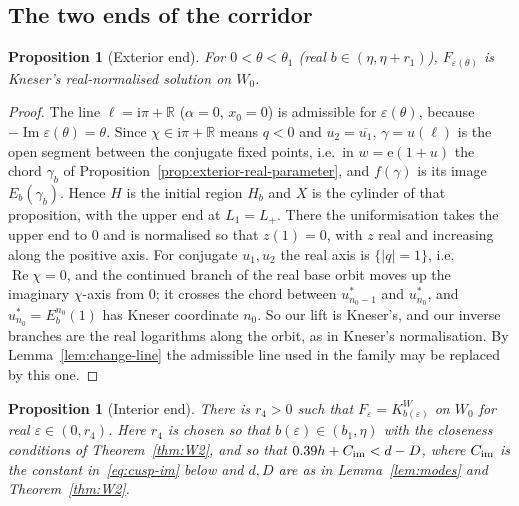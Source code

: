 \documentclass[11pt]{amsart}
\newtheorem{proposition}[theorem]{Proposition}
\theoremstyle{definition}
\newcommand{\Kk}{K}
\newcommand{\eee}{\mathrm{e}}
\newcommand{\ii}{\mathrm{i}}
\begin{document}
\subsection{The two ends of the corridor}

\begin{proposition}[Exterior end]\label{prop:cusp-exterior}
For $0<\theta<\theta_1$ (real $b\in(\eta,\eta+r_1)$), $F_{\varepsilon(\theta)}$ is Kneser's
real-normalised solution on $W_0$.
\end{proposition}

\begin{proof}
The line $\ell=\ii\pi+\mathbb R$ ($\alpha=0$, $x_0=0$) is admissible for $\varepsilon(\theta)$, because
$-\operatorname{Im}\varepsilon(\theta)=\theta$.  Since $\chi\in\ii\pi+\mathbb R$ means $q<0$ and $u_2=\overline{u_1}$,
$\gamma=u(\ell)$ is the open segment between the conjugate fixed points, i.e.\ in
$w=\eee(1+u)$ the chord $\gamma_b$ of Proposition~\ref{prop:exterior-real-parameter}, and
$f(\gamma)$ is its image $E_b(\gamma_b)$.  Hence $H$ is the initial region $H_b$ and $X$
is the cylinder of that proposition, with the upper end at $L_1=L_+$.  There
the uniformisation takes the upper end to $0$ and is normalised so that
$z(1)=0$, with $z$ real and increasing along the positive axis.  For
conjugate $u_1,u_2$ the real axis is $\{|q|=1\}$, i.e.\ $\operatorname{Re}\chi=0$, and the
continued branch of the real base orbit moves up the imaginary $\chi$-axis
from $0$; it crosses the chord between $u^*_{n_0-1}$ and $u^*_{n_0}$, and
$u^*_{n_0}=E_b^{n_0}(1)$ has Kneser coordinate $n_0$.  So our lift is Kneser's,
and our inverse branches are the real logarithms along the orbit, as in
Kneser's normalisation.  By Lemma~\ref{lem:change-line} the admissible line
used in the family may be replaced by this one.
\end{proof}

\begin{proposition}[Interior end]\label{prop:cusp-interior}
There is $r_4>0$ such that $F_\varepsilon=\Kk^W_{b(\varepsilon)}$ on $W_0$ for real $\varepsilon\in(0,r_4)$.
Here $r_4$ is chosen so that $b(\varepsilon)\in(b_1,\eta)$ with the closeness conditions
of Theorem~\ref{thm:W2}, and so that $0.39h+C_{\rm im}<d-D$, where $C_{\rm im}$ is the
constant in~\eqref{eq:cusp-im} below and $d,D$ are as in Lemma~\ref{lem:modes}
and Theorem~\ref{thm:W2}.
\end{proposition}
\end{document}
